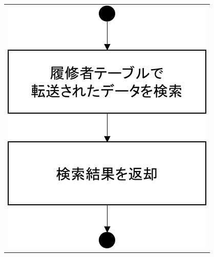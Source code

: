 \begin{figure}[htbp]
  \begin{tabular}{c}
 \begin{minipage}{0.33\hsize}
  \begin{center}
   \includegraphics[width=0.8\linewidth,clip]{./img/flow/23.png}
  \end{center}
 \end{minipage}
 \begin{minipage}{0.33\hsize}
  \begin{center}

\end{center}
\end{minipage}
\end{tabular}
\end{figure}
